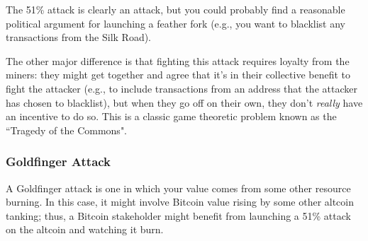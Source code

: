 \documentclass[12pt]{article}
\begin{document}
The 51\% attack is clearly an attack, but you could probably find a reasonable political argument for launching a feather fork (e.g., you want to blacklist any transactions from the Silk Road).

The other major difference is that fighting this attack requires loyalty from the miners: they might get together and agree that it's in their collective benefit to fight the attacker (e.g., to include transactions from an address that the attacker has chosen to blacklist), but when they go off on their own, they don't \textit{really} have an incentive to do so. This is a classic game theoretic problem known as the ``Tragedy of the Commons".

\subsubsection*{Goldfinger Attack}

A Goldfinger attack is one in which your value comes from some other resource burning. In this case, it might involve Bitcoin value rising by some other altcoin tanking; thus, a Bitcoin stakeholder might benefit from launching a 51\% attack on the altcoin and watching it burn.
\end{document}
